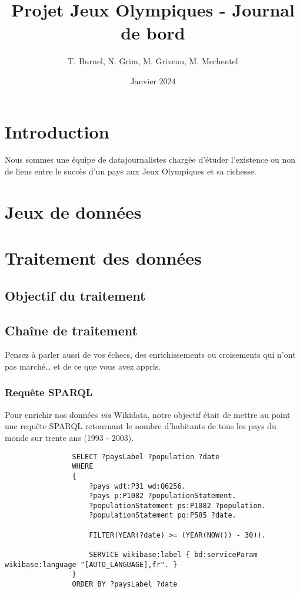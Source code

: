 \documentclass[12pt]{report}
\title{Projet Jeux Olympiques - Journal de bord}
\date{Janvier 2024}
\author{T. Burnel, N. Grim, M. Griveau, M. Mechentel}
\begin{document}
	\maketitle
	
	\section{Introduction}
	
	Nous sommes une équipe de datajournalistes chargée d'étuder l'existence ou non de liens entre le succès d'un pays aux Jeux Olympiques et sa richesse.
	
	\section{Jeux de données}	
	
	\section{Traitement des données}
	
		\subsection{Objectif du traitement}
		
		\subsection{Chaîne de traitement}
		
		Pensez à parler aussi de vos échecs, des enrichissements ou croisements qui n’ont pas marché… et de ce que vous avez appris.
		
			\subsubsection{Requête SPARQL}
			
			Pour enrichir nos données \emph{via} Wikidata, notre objectif était de mettre au point une requête SPARQL retournant le nombre d'habitants de tous les pays du monde sur trente ans (1993 - 2003).
			
			\begin{verbatim}
				SELECT ?paysLabel ?population ?date
				WHERE
				{
					?pays wdt:P31 wd:Q6256.
					?pays p:P1082 ?populationStatement.
					?populationStatement ps:P1082 ?population.
					?populationStatement pq:P585 ?date.
					
					FILTER(YEAR(?date) >= (YEAR(NOW()) - 30)).
					
					SERVICE wikibase:label { bd:serviceParam wikibase:language "[AUTO_LANGUAGE],fr". }
				}
				ORDER BY ?paysLabel ?date
			\end{verbatim}
		
\end{document}
